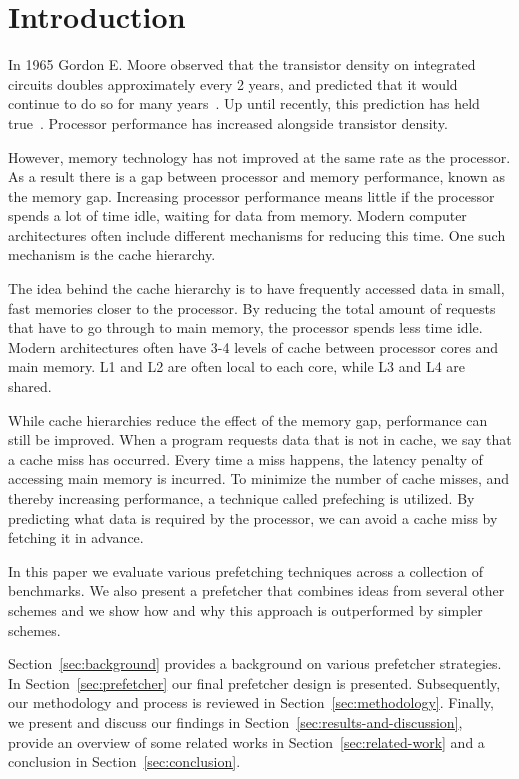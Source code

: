 \section{Introduction}
\label{sec:introduction}

In 1965 Gordon E. Moore observed that the transistor density on integrated circuits doubles approximately every 2 years,
and predicted that it would continue to do so for many years~\cite{bib:moore}.
Up until recently, this prediction has held true~\cite{bib:moore-slowdown}.
Processor performance has increased alongside transistor density.

However, memory technology has not improved at the same rate as the processor.
As a result there is a gap between processor and memory performance, known as the memory gap.
Increasing processor performance means little if the processor spends a lot of time idle, waiting for data from memory.
Modern computer architectures often include different mechanisms for reducing this time.
One such mechanism is the cache hierarchy.

The idea behind the cache hierarchy is to have frequently accessed data in small, fast memories closer to the processor.
By reducing the total amount of requests that have to go through to main memory, the processor spends less time idle.
Modern architectures often have 3-4 levels of cache between processor cores and main memory.
L1 and L2 are often local to each core, while L3 and L4 are shared.

While cache hierarchies reduce the effect of the memory gap, performance can still be improved.
When a program requests data that is not in cache, we say that a cache miss has occurred.
Every time a miss happens, the latency penalty of accessing main memory is incurred.
To minimize the number of cache misses, and thereby increasing performance, a technique called prefeching is utilized.
By predicting what data is required by the processor, we can avoid a cache miss by fetching it in advance.

In this paper we evaluate various prefetching techniques across a collection of benchmarks.
We also present a prefetcher that combines ideas from several other schemes and
we show how and why this approach is outperformed by simpler schemes.

Section~\ref{sec:background} provides a background on various prefetcher strategies.
In Section~\ref{sec:prefetcher} our final prefetcher design is presented.
Subsequently, our methodology and process is reviewed in Section~\ref{sec:methodology}.
Finally, we present and discuss our findings in Section~\ref{sec:results-and-discussion}, provide an overview of some related works in Section~\ref{sec:related-work} and a conclusion in Section~\ref{sec:conclusion}.


